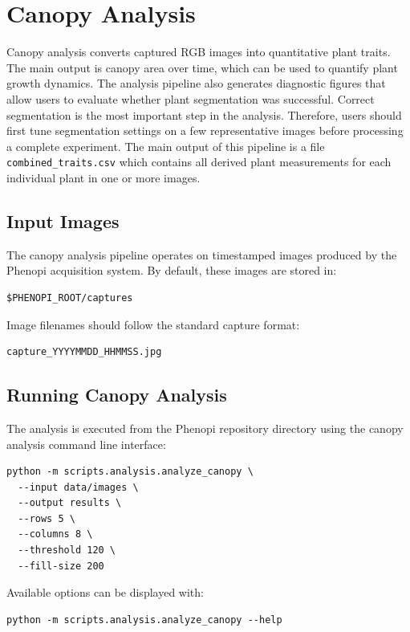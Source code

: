 \section{Canopy Analysis}

Canopy analysis converts captured RGB images into quantitative plant traits.
The main output is canopy area over time, which can be used to quantify plant
growth dynamics. The analysis pipeline also generates diagnostic figures that
allow users to evaluate whether plant segmentation was successful. Correct
segmentation is the most important step in the analysis. Therefore, users
should first tune segmentation settings on a few representative images before
processing a complete experiment. The main output of this pipeline is a file
\texttt{combined\_traits.csv} which contains all derived plant measurements for
each individual plant in one or more images.

\subsection{Input Images}

The canopy analysis pipeline operates on timestamped images produced by the
Phenopi acquisition system. By default, these images are stored in:

\begin{verbatim}
$PHENOPI_ROOT/captures
\end{verbatim}

Image filenames should follow the standard capture format:

\begin{verbatim}
capture_YYYYMMDD_HHMMSS.jpg
\end{verbatim}

\subsection{Running Canopy Analysis}

The analysis is executed from the Phenopi repository directory using the canopy
analysis command line interface:

\begin{verbatim}
python -m scripts.analysis.analyze_canopy \
  --input data/images \
  --output results \
  --rows 5 \
  --columns 8 \
  --threshold 120 \
  --fill-size 200
\end{verbatim}

Available options can be displayed with:

\begin{verbatim}
python -m scripts.analysis.analyze_canopy --help
\end{verbatim}

